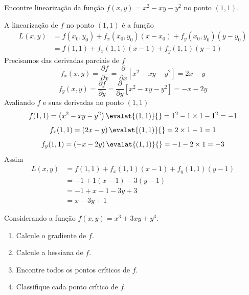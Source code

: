 \documentclass[a4paper,12pt,fleqn]{article}
\newcommand{\D}[2]{\frac{\partial {#1}}{\partial {#2}}}
\begin{document}
Encontre linearização da função
\(
  f(x, y) = x^2 - xy - y^2
\)
no ponto \((1, 1)\).

\begin{answer}
  A linearização de $f$ no ponto \((1, 1)\) é a função
  \begin{align*}
    L(x, y)
    & = f(x_0, y_0) + f_x(x_0, y_0)(x-x_0) + f_y(x_0, y_0)(y-y_0) \\
    & = f(1, 1) + f_x(1, 1)(x-1) + f_y(1, 1)(y-1)
  \end{align*}
  Precisamos das derivadas parciais de $f$
  \[
    f_x(x, y)
    = \D{f}{x}
    = \D{}{x}\left[x^2 - xy - y^2\right]
    = 2x -y
  \]
  \[
    f_y(x, y)
    = \D{f}{y}
    = \D{}{y}\left[x^2 - xy - y^2\right]
    = -x -2y
  \]
  Avaliando $f$ e suas derivadas no ponto $(1, 1)$
  \[
    f(1, 1)
    = \left(x^2 - xy - y^2\right)\evalat{(1, 1)}{}
    = 1^2 - 1\times 1 - 1^2
    = -1
  \]
  \[
    f_x(1, 1)
    = \left(2x -y\right)\evalat{(1, 1)}{}
    = 2\times 1 - 1
    = 1
  \]
  \[
    f_y(1, 1)
    = \left(-x -2y\right)\evalat{(1, 1)}{}
    = -1 -2 \times 1
    = -3
  \]
  Assim
  \begin{align*}
    L(x, y)
    & = f(1, 1) + f_x(1, 1)(x-1) + f_y(1, 1)(y-1) \\
    & = -1 + 1(x-1) -3(y-1) \\
    & = -1 + x -1 -3y +3 \\
    & = x - 3y + 1
  \end{align*}
  \clearpage
\end{answer}


Considerando a função
\(
  f(x, y) = x^3 + 3xy + y^3
\).
\begin{enumerate}[leftmargin=15mm,labelwidth=11.5mm,align=left]
  \item[a) {[5]}] Calcule o gradiente de $f$.
  \item[b) {[5]}] Calcule a hessiana de $f$.
  \item[c) {[10]}] Encontre todos os pontos críticos de $f$.
  \item[d) {[10]}] Classifique cada ponto crítico de $f$.
\end{enumerate}
\end{document}
